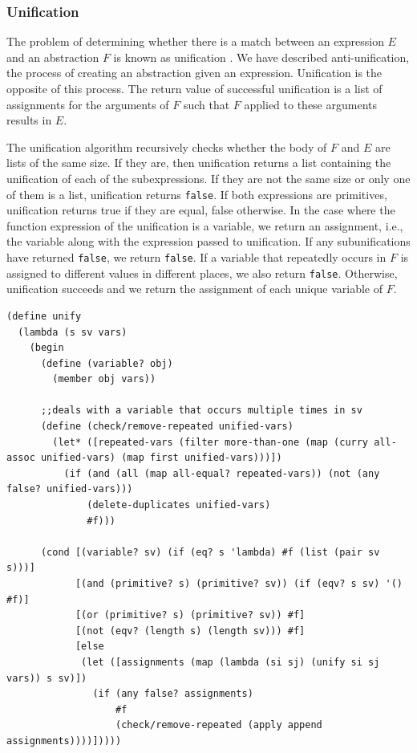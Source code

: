 \documentclass[a4paper,10pt]{article}
\begin{document}
\subsubsection{Unification}

The problem of determining whether there is a match between an expression $E$ and an abstraction $F$ is known as unification \cite{Robinson:1965:MLB:321250.321253}. We have described anti-unification, the process of creating an abstraction given an expression. Unification is the opposite of this process.  The return value of successful unification is a list of assignments for the arguments of $F$ such that $F$ applied to these arguments results in $E$.

The unification algorithm recursively checks whether the body of $F$ and $E$ are lists of the same size.  If they are, then unification returns a list containing the unification of each of the subexpressions.  If they are not the same size or only one of them is a list, unification returns \texttt{false}.  If both expressions are primitives, unification returns true if they are equal, false otherwise.  In the case where the function expression of the unification is a variable, we return an assignment, i.e., the variable along with the expression passed to unification. If any subunifications have returned \texttt{false}, we return \texttt{false}. If a variable that repeatedly occurs in $F$ is assigned to different values in different places, we also return \texttt{false}.
Otherwise, unification succeeds and we return the assignment of each unique variable of $F$.

\begin{lstlisting}[frame=trbl]
(define unify
  (lambda (s sv vars)
    (begin
      (define (variable? obj)
        (member obj vars))

      ;;deals with a variable that occurs multiple times in sv
      (define (check/remove-repeated unified-vars)
        (let* ([repeated-vars (filter more-than-one (map (curry all-assoc unified-vars) (map first unified-vars)))])
          (if (and (all (map all-equal? repeated-vars)) (not (any false? unified-vars)))
              (delete-duplicates unified-vars)
              #f)))
      
      (cond [(variable? sv) (if (eq? s 'lambda) #f (list (pair sv s)))]
            [(and (primitive? s) (primitive? sv)) (if (eqv? s sv) '() #f)]
            [(or (primitive? s) (primitive? sv)) #f]
            [(not (eqv? (length s) (length sv))) #f]
            [else
             (let ([assignments (map (lambda (si sj) (unify si sj vars)) s sv)])
               (if (any false? assignments)
                   #f
                   (check/remove-repeated (apply append assignments))))]))))
\end{lstlisting}
\end{document}
